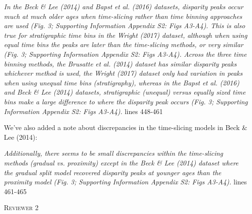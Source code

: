 \documentclass[12pt,letterpaper]{article}
\renewcommand{\section}[1]{%
\bigskip
\begin{center}
\begin{Large}
\normalfont\scshape #1
\medskip
\end{Large}
\end{center}}
\begin{document}
\begin{enumerate}
\textit{In the Beck \& Lee (2014) and Bapst et al. (2016) datasets, disparity peaks occur much at much older ages when time-slicing rather than time binning approaches are used (Fig. 3; Supporting Information Appendix S2: Figs A3-A4).
This is also true for stratigraphic time bins in the Wright (2017) dataset, although when using equal time bins the peaks are later than the time-slicing methods, or very similar (Fig. 3; Supporting Information Appendix S2: Figs A3-A4).
Across the three time binning methods, the Brusatte et al. (2014) dataset has similar disparity peaks whichever method is used, the Wright (2017) dataset only had variation in peaks when using unequal time bins (stratigraphy), whereas in the Bapst et al. (2016) and Beck \& Lee (2014) datasets, stratigraphic (unequal) versus equally sized time bins make a large difference to where the disparity peak occurs (Fig. 3; Supporting Information Appendix S2: Figs A3-A4).} lines 448-461

We've also added a note about discrepancies in the time-slicing models in Beck \& Lee (2014): 

\textit{Additionally, there seems to be small discrepancies within the time-slicing methods (gradual vs. proximity) except in the Beck \& Lee (2014) dataset where the gradual split model recovered disparity peaks at younger ages than the proximity model (Fig. 3; Supporting Information Appendix S2: Figs A3-A4).} lines 461-465

\end{enumerate}

%
%

\section{Reviewer 2}
\end{document}
